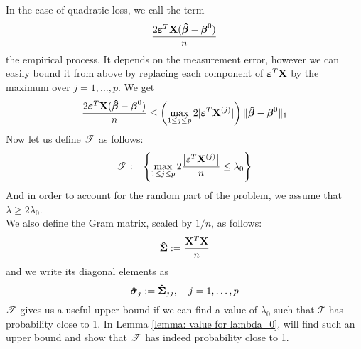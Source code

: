 In the case of quadratic loss, we call the term
\[
    \frac{2 \boldsymbol{\varepsilon}^T \mathbf{X} ( \boldsymbol{\hat{\beta}} - \boldsymbol{\beta}^0)}{n}
\]
the empirical process. It depends on the measurement error, however we can easily bound it from above by replacing each component of \(\boldsymbol{\varepsilon}^T \mathbf{X}\) by the maximum over \(j = 1, \ldots, p\). We get \\
\[
    \frac{2 \boldsymbol{\varepsilon}^T \mathbf{X} ( \boldsymbol{\hat{\beta}} - \boldsymbol{\beta}^0)}{n} \leq \left( \max_{1 \leq j \leq p} 2 | \boldsymbol{\varepsilon}^T \mathbf{X}^{(j)}|\right) \| \boldsymbol{\hat{\beta}} - \boldsymbol{\beta}^0 \|_1
\]
Now let us define \(\mathscr{T}\) as follows:
\[
    \mathscr{T} := \left\{ \max _{1 \leq j \leq p} 2 \frac{\left| \varepsilon^{T} \mathbf{X}^{(j)}\right|}{n} \leq \lambda_{0}\right\}
\]
And in order to account for the random part of the problem, we assume that \(\lambda \geq 2 \lambda_0\). \\
We also define the Gram matrix, scaled by \(1/n\), as follows:
\[
    \boldsymbol{\hat{\Sigma}} := \frac{\mathbf{X}^T \mathbf{X}}{n}
\]
and we write its diagonal elements as
\[
    \boldsymbol{\hat{\sigma}}_j := \boldsymbol{\hat{\Sigma}}_{jj}, \quad j = 1, \ldots, p
\]
\(\mathscr{T}\) gives us a useful upper bound if we can find a value of \(\lambda_0\) such that \(\mathscr{T}\) has probability close to 1. In Lemma \ref{lemma: value for lambda_0}, will find such an upper bound and show that \(\mathscr{T}\) has indeed probability close to 1.

